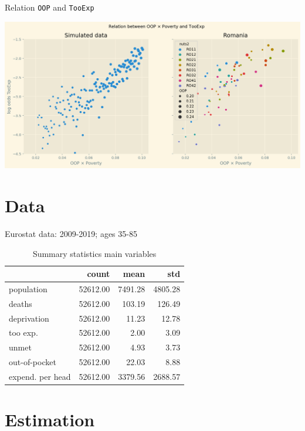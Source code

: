 \documentclass[presentation]{beamer}
\begin{document}
\begin{frame}[label={sec:org7aa6fc2},fragile]{Relation \texttt{OOP} and \texttt{TooExp}}
 \begin{center}
\includegraphics[width=.9\linewidth]{./figures/Parametric3.png}
\label{fig:Parametric}
\end{center}
\end{frame}

\section*{Data}
\label{sec:org93fd4a2}

\begin{frame}[label={sec:orgbf83a76}]{Eurostat data: 2009-2019; ages 35-85}
\begin{table}[htbp]
\caption{\label{tab:summary}Summary statistics main variables}
\centering
\begin{tabular}{lrrr}
 & count & mean & std\\
\hline
population & 52612.00 & 7491.28 & 4805.28\\
deaths & 52612.00 & 103.19 & 126.49\\
deprivation & 52612.00 & 11.23 & 12.78\\
too exp. & 52612.00 & 2.00 & 3.09\\
unmet & 52612.00 & 4.93 & 3.73\\
out-of-pocket & 52612.00 & 22.03 & 8.88\\
expend. per head & 52612.00 & 3379.56 & 2688.57\\
\end{tabular}
\end{table}
\end{frame}




\section*{Estimation}
\label{sec:org76e595d}
\end{document}
